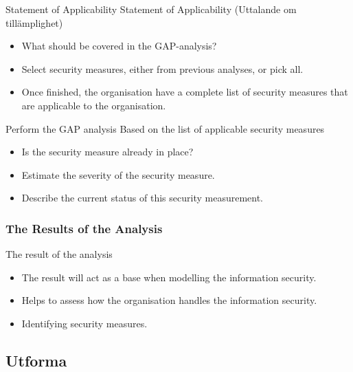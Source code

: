 \documentclass{beamer}
\begin{document}
\begin{frame}{Statement of Applicability}{\insertsubsubsectionhead}
  Statement of Applicability (Uttalande om tillämplighet)
  \begin{itemize}
    \item What should be covered in the GAP-analysis?
    \item Select security measures, either from previous analyses, or pick all.  
    \item Once finished, the organisation have a complete list of security
      measures that are applicable to the organisation.
  \end{itemize}
\end{frame}
\begin{frame}{Perform the GAP analysis}{\insertsubsubsectionhead}
  Based on the list of applicable security measures
  \begin{itemize}
    \item Is the security measure already in place?
    \item Estimate the severity of the security measure.
    \item Describe the current status of this security measurement.
  \end{itemize}
\end{frame}
\subsubsection{The Results of the Analysis}
\begin{frame}{The result of the analysis}{\insertsubsubsectionhead}
  \begin{itemize}
    \item The result will act as a base when modelling the information security.
    \item Helps to assess how the organisation handles the information security.
    \item Identifying security measures.
  \end{itemize}
  
\end{frame}

\subsection{Utforma}
\end{document}
